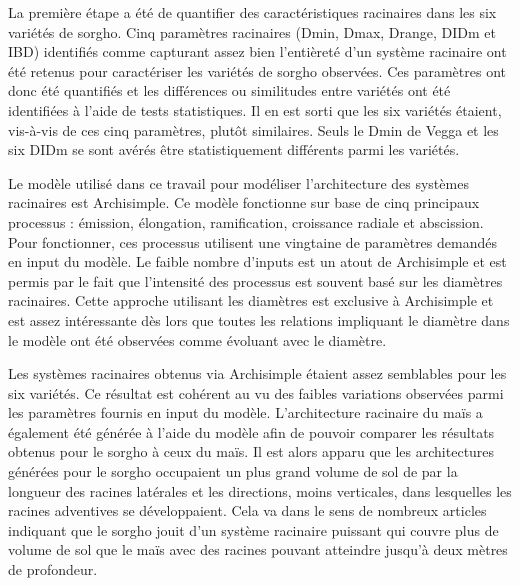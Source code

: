 La première étape a été de quantifier des caractéristiques racinaires dans les six variétés de sorgho.
Cinq paramètres racinaires (Dmin, Dmax, Drange, DIDm et IBD) identifiés comme capturant assez bien l'entièreté d'un système racinaire ont été retenus pour caractériser les variétés de sorgho observées.
Ces paramètres ont donc été quantifiés et les différences ou similitudes entre variétés ont été identifiées à l'aide de tests statistiques.
Il en est sorti que les six variétés étaient, vis-à-vis de ces cinq paramètres, plutôt similaires.
Seuls le Dmin de Vegga et les six DIDm se sont avérés être statistiquement différents parmi les variétés.
\newline

Le modèle utilisé dans ce travail pour modéliser l'architecture des systèmes racinaires est Archisimple.
Ce modèle fonctionne sur base de cinq principaux processus : émission, élongation, ramification, croissance radiale et abscission.
Pour fonctionner, ces processus utilisent une vingtaine de paramètres demandés en input du modèle.
Le faible nombre d'inputs est un atout de Archisimple et est permis par le fait que l'intensité des processus est souvent basé sur les diamètres racinaires.
Cette approche utilisant les diamètres est exclusive à Archisimple et est assez intéressante dès lors que toutes les relations impliquant le diamètre dans le modèle ont été observées comme évoluant avec le diamètre.
\newline

Les systèmes racinaires obtenus via Archisimple étaient assez semblables pour les six variétés.
Ce résultat est cohérent au vu des faibles variations observées parmi les paramètres fournis en input du modèle.
L'architecture racinaire du maïs a également été générée à l'aide du modèle afin de pouvoir comparer les résultats obtenus pour le sorgho à ceux du maïs.
Il est alors apparu que les architectures générées pour le sorgho occupaient un plus grand volume de sol de par la longueur des racines latérales et les directions, moins verticales, dans lesquelles les racines adventives se développaient.
Cela va dans le sens de nombreux articles indiquant que le sorgho jouit d'un système racinaire puissant qui couvre plus de volume de sol que le maïs avec des racines pouvant atteindre jusqu'à deux mètres de profondeur.
\newline

